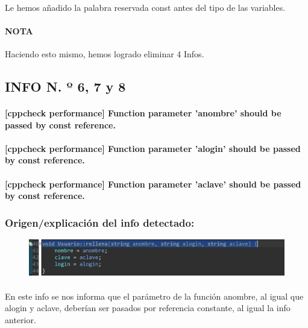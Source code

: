 			\paragraph{}Le hemos añadido la palabra reservada const antes del tipo de las variables.
			
			\paragraph{NOTA}Haciendo esto mismo, hemos logrado eliminar 4 Infos.
			
	\subsection{INFO N. º 6, 7 y 8}
	
		\paragraph{[cppcheck performance] Function parameter 'anombre' should be passed by const reference.}
		
		\paragraph{[cppcheck performance] Function parameter 'alogin' should be passed by const reference.}
		
		\paragraph{[cppcheck performance] Function parameter 'aclave' should be passed by const reference.}
	
		\subsubsection{Origen/explicación del info detectado:}
		
			\begin{figure}[H]
				\centering
				\includegraphics[scale=0.55]{img/esteban12.png}
				\label{esteban12}
			\end{figure}
		
			\paragraph{}En este info se nos informa que el parámetro de la función anombre, al igual que alogin y aclave, deberían ser pasados por referencia constante, al igual la info anterior.
			

